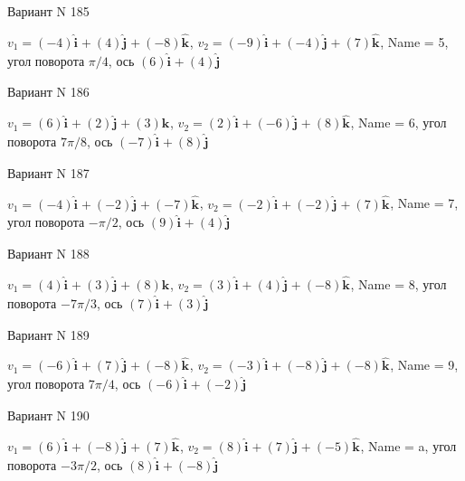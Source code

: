 \documentclass[11pt]{report}
\begin{document}
Вариант N 185

$v_1 = \left(-4\right)\mathbf{\hat{i}_{}} + \left(4\right)\mathbf{\hat{j}_{}} + \left(-8\right)\mathbf{\hat{k}_{}}$, $v_2 = \left(-9\right)\mathbf{\hat{i}_{}} + \left(-4\right)\mathbf{\hat{j}_{}} + \left(7\right)\mathbf{\hat{k}_{}}$, Name = 5, угол поворота $\pi / 4$, ось $\left(6\right)\mathbf{\hat{i}_{}} + \left(4\right)\mathbf{\hat{j}_{}}$

Вариант N 186

$v_1 = \left(6\right)\mathbf{\hat{i}_{}} + \left(2\right)\mathbf{\hat{j}_{}} + \left(3\right)\mathbf{\hat{k}_{}}$, $v_2 = \left(2\right)\mathbf{\hat{i}_{}} + \left(-6\right)\mathbf{\hat{j}_{}} + \left(8\right)\mathbf{\hat{k}_{}}$, Name = 6, угол поворота $7 \pi / 8$, ось $\left(-7\right)\mathbf{\hat{i}_{}} + \left(8\right)\mathbf{\hat{j}_{}}$

Вариант N 187

$v_1 = \left(-4\right)\mathbf{\hat{i}_{}} + \left(-2\right)\mathbf{\hat{j}_{}} + \left(-7\right)\mathbf{\hat{k}_{}}$, $v_2 = \left(-2\right)\mathbf{\hat{i}_{}} + \left(-2\right)\mathbf{\hat{j}_{}} + \left(7\right)\mathbf{\hat{k}_{}}$, Name = 7, угол поворота $- \pi / 2$, ось $\left(9\right)\mathbf{\hat{i}_{}} + \left(4\right)\mathbf{\hat{j}_{}}$

Вариант N 188

$v_1 = \left(4\right)\mathbf{\hat{i}_{}} + \left(3\right)\mathbf{\hat{j}_{}} + \left(8\right)\mathbf{\hat{k}_{}}$, $v_2 = \left(3\right)\mathbf{\hat{i}_{}} + \left(4\right)\mathbf{\hat{j}_{}} + \left(-8\right)\mathbf{\hat{k}_{}}$, Name = 8, угол поворота $- 7 \pi / 3$, ось $\left(7\right)\mathbf{\hat{i}_{}} + \left(3\right)\mathbf{\hat{j}_{}}$

Вариант N 189

$v_1 = \left(-6\right)\mathbf{\hat{i}_{}} + \left(7\right)\mathbf{\hat{j}_{}} + \left(-8\right)\mathbf{\hat{k}_{}}$, $v_2 = \left(-3\right)\mathbf{\hat{i}_{}} + \left(-8\right)\mathbf{\hat{j}_{}} + \left(-8\right)\mathbf{\hat{k}_{}}$, Name = 9, угол поворота $7 \pi / 4$, ось $\left(-6\right)\mathbf{\hat{i}_{}} + \left(-2\right)\mathbf{\hat{j}_{}}$

Вариант N 190

$v_1 = \left(6\right)\mathbf{\hat{i}_{}} + \left(-8\right)\mathbf{\hat{j}_{}} + \left(7\right)\mathbf{\hat{k}_{}}$, $v_2 = \left(8\right)\mathbf{\hat{i}_{}} + \left(7\right)\mathbf{\hat{j}_{}} + \left(-5\right)\mathbf{\hat{k}_{}}$, Name = a, угол поворота $- 3 \pi / 2$, ось $\left(8\right)\mathbf{\hat{i}_{}} + \left(-8\right)\mathbf{\hat{j}_{}}$
\end{document}
